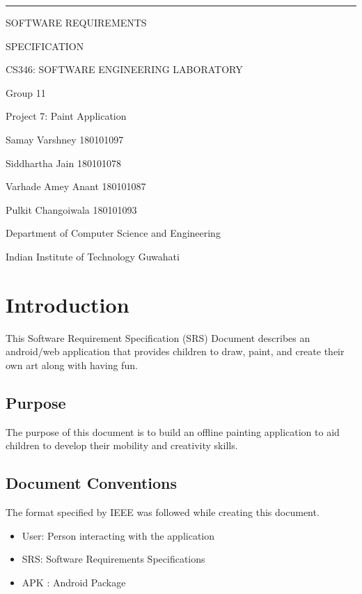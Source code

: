 \documentclass{scrreprt}
\date{}
\begin{document}
\begin{flushleft}
    \rule{14.5cm}{5pt}\vskip1cm
    \begin{bfseries}
        \huge{\centerline{SOFTWARE REQUIREMENTS}}
        \huge{\centerline{SPECIFICATION}}
        \vspace{1.5cm}
        \LARGE \centerline{CS346: SOFTWARE ENGINEERING LABORATORY} 
        \vspace{2cm}
        \LARGE \centerline{Group 11} 
        \LARGE \centerline{Project 7: Paint Application}
        \vspace{2cm}
        \LARGE \centerline{Samay Varshney  180101097}
        \centerline{Siddhartha Jain  180101078}
        \centerline{Varhade Amey Anant  180101087}
        \centerline{Pulkit Changoiwala  180101093}
        \vspace{4cm}
        \LARGE \centerline{Department of Computer Science and Engineering}
        \centerline{Indian Institute of Technology Guwahati}
        \vspace{1.9cm}
    \end{bfseries}
\end{flushleft}

\tableofcontents

\chapter{Introduction}
This Software Requirement Specification (SRS) Document describes an
android/web application that provides children to draw, paint, and create their own art along with having fun. 

\section{Purpose}
The purpose of this document is to build an offline painting application to aid children to develop their mobility and creativity skills.

\section{Document Conventions}
The format specified by IEEE was followed while creating this document.
\begin{itemize}[itemsep=0.5pt]
    \item User: Person interacting with the application
    \item SRS: Software Requirements Specifications
    \item APK : Android Package
\end{itemize}
\end{document}
